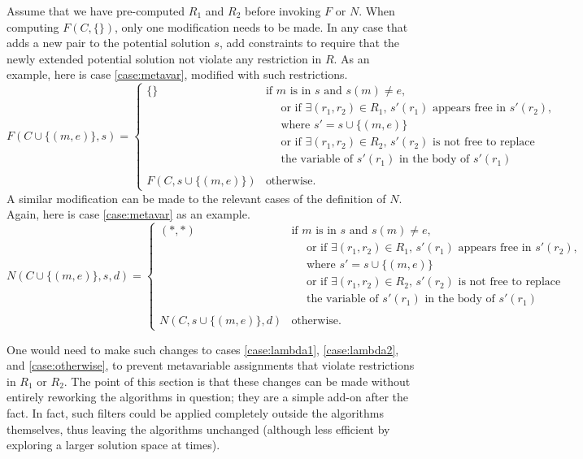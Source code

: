 \documentclass{article}
\begin{document}
Assume that we have pre-computed $R_1$ and $R_2$ before invoking $F$ or $N$.  When computing $F(C,\{\})$, only one modification needs to be made.  In any case that adds a new pair to the potential solution $s$, add constraints to require that the newly extended potential solution not violate any restriction in $R$.  As an example, here is case \ref{case:metavar}, modified with such restrictions.
	$$
       	F(C\cup\{(m,e)\},s) = \left\{
           	\begin{array}{ll}
                \{\} & \text{if $m$ is in $s$ and $s(m)\neq e$,} \\
                	 & \text{~ ~ or if $\exists(r_1,r_2)\in R_1$, $s'(r_1)$ appears free in $s'(r_2)$,} \\
	 				 & \text{~ ~ where $s'=s\cup\{(m,e)\}$} \\
                	 & \text{~ ~ or if $\exists(r_1,r_2)\in R_2$, $s'(r_2)$ is not free to replace} \\
	 				 & \text{~ ~ the variable of $s'(r_1)$ in the body of $s'(r_1)$} \\
                & \\
                F(C,s\cup\{(m,e)\}) & \text{otherwise.}
            \end{array}
        \right.
    $$
A similar modification can be made to the relevant cases of the definition of $N$.  Again, here is case \ref{case:metavar} as an example.
	$$
        N(C\cup\{(m,e)\},s,d) = \left\{
    	   	\begin{array}{ll}
                (*,*)					& \text{if $m$ is in $s$ and $s(m)\neq e$,} \\
                	 & \text{~ ~ or if $\exists(r_1,r_2)\in R_1$, $s'(r_1)$ appears free in $s'(r_2)$,} \\
	 				 & \text{~ ~ where $s'=s\cup\{(m,e)\}$} \\
                	 & \text{~ ~ or if $\exists(r_1,r_2)\in R_2$, $s'(r_2)$ is not free to replace} \\
	 				 & \text{~ ~ the variable of $s'(r_1)$ in the body of $s'(r_1)$} \\
                & \\
                N(C,s\cup\{(m,e)\},d)	& \text{otherwise.}
            \end{array}
        \right.
    $$

One would need to make such changes to cases \ref{case:lambda1}, \ref{case:lambda2}, and \ref{case:otherwise}, to prevent metavariable assignments that violate restrictions in $R_1$ or $R_2$.  The point of this section is that these changes can be made without entirely reworking the algorithms in question; they are a simple add-on after the fact.  In fact, such filters could be applied completely outside the algorithms themselves, thus leaving the algorithms unchanged (although less efficient by exploring a larger solution space at times).
\end{document}
